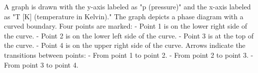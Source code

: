 A graph is drawn with the y-axis labeled as "p (pressure)" and the x-axis labeled as "T [K] (temperature in Kelvin)." The graph depicts a phase diagram with a curved boundary. Four points are marked:  
- Point 1 is on the lower right side of the curve.  
- Point 2 is on the lower left side of the curve.  
- Point 3 is at the top of the curve.  
- Point 4 is on the upper right side of the curve.  
Arrows indicate the transitions between points:  
- From point 1 to point 2.  
- From point 2 to point 3.  
- From point 3 to point 4.